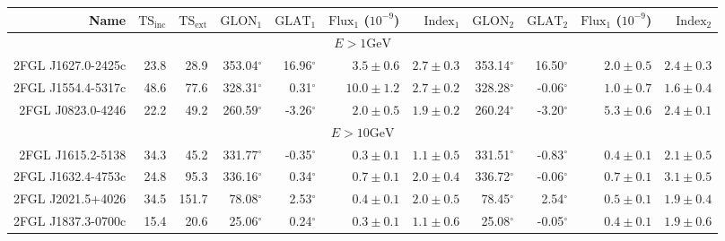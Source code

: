 \documentclass[12pt,preprint]{aastex}
\newcommand{\gev}{\text{GeV}\xspace}
\newcommand{\tsext}{{\ensuremath{\text{TS}_\text{ext}}}\xspace}
\newcommand{\tsinc}{\ensuremath{\text{TS}_\text{inc}}\xspace}
\newcommand{\glon}{\text{GLON}\xspace}
\newcommand{\glat}{\text{GLAT}\xspace}
\renewcommand{\deg}{\ensuremath{^\circ}\xspace}
\begin{document}
\clearpage
\begin{table}
    \begin{centering}
      \begin{tabular}{r|rr|rrrr|rrrr}
        \hline
        \hline
        Name                 &     \tsinc &     \tsext &      $\glon_1$ &      $\glat_1$ & $\text{Flux}_1$ ($10^{-9}$) &   $\text{Index}_1$ &      $\glon_2$ &      $\glat_2$ & $\text{Flux}_1$ ($10^{-9}$) &  $\text{Index}_2$ \\
        \hline
        \multicolumn{11}{c}{$E > 1\gev$} \\
        \hline
        2FGL J1627.0-2425c   &       23.8 &       28.9 &     353.04\deg &      16.96\deg & $       3.5 \pm        0.6$ & $  2.7 \pm   0.3$  &     353.14\deg &      16.50\deg & $       2.0 \pm        0.5$ & $  2.4 \pm   0.3$ \\
        2FGL J1554.4-5317c   &       48.6 &       77.6 &     328.31\deg &       0.31\deg & $      10.0 \pm        1.2$ & $  2.7 \pm   0.2$  &     328.28\deg &      -0.06\deg & $       1.0 \pm        0.7$ & $  1.6 \pm   0.4$ \\
        2FGL J0823.0-4246    &       22.2 &       49.2 &     260.59\deg &      -3.26\deg & $       2.0 \pm        0.5$ & $  1.9 \pm   0.2$  &     260.24\deg &      -3.20\deg & $       5.3 \pm        0.6$ & $  2.4 \pm   0.1$ \\
        \hline
        \multicolumn{11}{c}{$E > 10\gev$} \\
        \hline
        2FGL J1615.2-5138    &       34.3 &       45.2 &     331.77\deg &      -0.35\deg & $       0.3 \pm        0.1$ & $  1.1 \pm   0.5$  &     331.51\deg &      -0.83\deg & $       0.4 \pm        0.1$ & $  2.1 \pm   0.5$ \\
        2FGL J1632.4-4753c   &       24.8 &       95.3 &     336.16\deg &       0.34\deg & $       0.7 \pm        0.1$ & $  2.0 \pm   0.4$  &     336.72\deg &      -0.06\deg & $       0.7 \pm        0.1$ & $  3.1 \pm   0.5$ \\
        2FGL J2021.5+4026    &       34.5 &      151.7 &      78.08\deg &       2.53\deg & $       0.4 \pm        0.1$ & $  2.0 \pm   0.5$  &      78.45\deg &       2.54\deg & $       0.5 \pm        0.1$ & $  1.9 \pm   0.4$ \\
        2FGL J1837.3-0700c   &       15.4 &       20.6 &      25.06\deg &       0.24\deg & $       0.3 \pm        0.1$ & $  1.1 \pm   0.6$  &      25.08\deg &      -0.05\deg & $       0.4 \pm        0.1$ & $  1.9 \pm   0.6$ \\

\end{tabular}
\end{centering}
\end{table}
\end{document}
